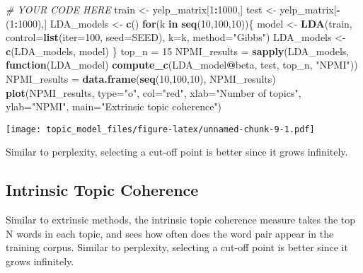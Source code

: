 \documentclass[]{article}
\newenvironment{Shaded}{\begin{snugshade}}{\end{snugshade}}
\newcommand{\CommentTok}[1]{\textcolor[rgb]{0.56,0.35,0.01}{\textit{#1}}}
\newcommand{\ControlFlowTok}[1]{\textcolor[rgb]{0.13,0.29,0.53}{\textbf{#1}}}
\newcommand{\DataTypeTok}[1]{\textcolor[rgb]{0.13,0.29,0.53}{#1}}
\newcommand{\DecValTok}[1]{\textcolor[rgb]{0.00,0.00,0.81}{#1}}
\newcommand{\KeywordTok}[1]{\textcolor[rgb]{0.13,0.29,0.53}{\textbf{#1}}}
\newcommand{\NormalTok}[1]{#1}
\newcommand{\OperatorTok}[1]{\textcolor[rgb]{0.81,0.36,0.00}{\textbf{#1}}}
\newcommand{\StringTok}[1]{\textcolor[rgb]{0.31,0.60,0.02}{#1}}
\begin{document}
\begin{Shaded}
\begin{Highlighting}[]
\CommentTok{# YOUR CODE HERE}
\NormalTok{train <-}\StringTok{ }\NormalTok{yelp_matrix[}\DecValTok{1}\OperatorTok{:}\DecValTok{1000}\NormalTok{,]}
\NormalTok{test <-}\StringTok{ }\NormalTok{yelp_matrix[}\OperatorTok{-}\NormalTok{(}\DecValTok{1}\OperatorTok{:}\DecValTok{1000}\NormalTok{),]}
\NormalTok{LDA_models <-}\StringTok{ }\KeywordTok{c}\NormalTok{()}
\ControlFlowTok{for}\NormalTok{(k }\ControlFlowTok{in} \KeywordTok{seq}\NormalTok{(}\DecValTok{10}\NormalTok{,}\DecValTok{100}\NormalTok{,}\DecValTok{10}\NormalTok{))\{}
\NormalTok{  model <-}\StringTok{ }\KeywordTok{LDA}\NormalTok{(train, }\DataTypeTok{control=}\KeywordTok{list}\NormalTok{(}\DataTypeTok{iter=}\DecValTok{100}\NormalTok{, }\DataTypeTok{seed=}\NormalTok{SEED), }\DataTypeTok{k=}\NormalTok{k, }\DataTypeTok{method=}\StringTok{"Gibbs"}\NormalTok{)}
\NormalTok{  LDA_models <-}\StringTok{ }\KeywordTok{c}\NormalTok{(LDA_models, model)}
\NormalTok{\}}
\NormalTok{top_n =}\StringTok{ }\DecValTok{15}
\NormalTok{NPMI_results =}\StringTok{ }\KeywordTok{sapply}\NormalTok{(LDA_models, }\ControlFlowTok{function}\NormalTok{(LDA_model) }\KeywordTok{compute_c}\NormalTok{(LDA_model}\OperatorTok{@}\NormalTok{beta, test, top_n, }\StringTok{"NPMI"}\NormalTok{))}
\NormalTok{NPMI_results =}\StringTok{ }\KeywordTok{data.frame}\NormalTok{(}\KeywordTok{seq}\NormalTok{(}\DecValTok{10}\NormalTok{,}\DecValTok{100}\NormalTok{,}\DecValTok{10}\NormalTok{), NPMI_results)}
\KeywordTok{plot}\NormalTok{(NPMI_results, }\DataTypeTok{type=}\StringTok{"o"}\NormalTok{, }\DataTypeTok{col=}\StringTok{"red"}\NormalTok{, }\DataTypeTok{xlab=}\StringTok{"Number of topics"}\NormalTok{, }\DataTypeTok{ylab=}\StringTok{"NPMI"}\NormalTok{, }\DataTypeTok{main=}\StringTok{"Extrinsic topic coherence"}\NormalTok{)}
\end{Highlighting}
\end{Shaded}

\texttt{[image: topic\_model\_files/figure-latex/unnamed-chunk-9-1.pdf]}

Similar to perplexity, selecting a cut-off point is better since it
grows infinitely.

\hypertarget{intrinsic-topic-coherence}{%
\subsection{Intrinsic Topic Coherence}\label{intrinsic-topic-coherence}}

Similar to extrinsic methods, the intrinsic topic coherence measure
takes the top N words in each topic, and sees how often does the word
pair appear in the training corpus. Similar to perplexity, selecting a
cut-off point is better since it grows infinitely.
\end{document}
